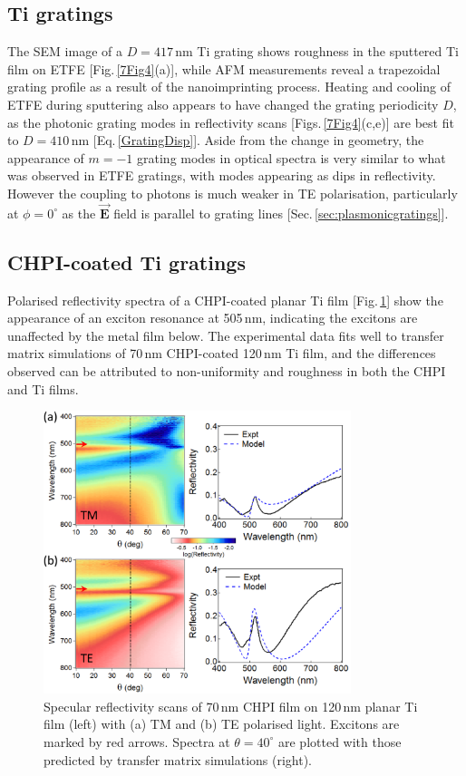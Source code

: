\subsection{Ti gratings}
The SEM image of a $D=417$\,nm Ti grating shows roughness in the sputtered Ti film on ETFE [Fig.\,\ref{7Fig4}(a)], while AFM measurements reveal a trapezoidal grating profile as a result of the nanoimprinting process. Heating and cooling of ETFE during sputtering also appears to have changed the grating periodicity $D$, as the photonic grating modes in reflectivity scans [Figs.\,\ref{7Fig4}(c,e)] are best fit to $D=410$\,nm [Eq.\,\ref{GratingDisp}]. Aside from the change in geometry, the appearance of $m=-1$ grating modes in optical spectra is very similar to what was observed in ETFE gratings, with modes appearing as dips in reflectivity. However the coupling to photons is much weaker in TE polarisation, particularly at $\phi=0^{\circ}$ as the $\vec{\mathbf{E}}$ field is parallel to grating lines [Sec.\,\ref{sec:plasmonicgratings}].



\subsection{CHPI-coated Ti gratings}
Polarised reflectivity spectra of a CHPI-coated planar Ti film [Fig.\,\ref{7Fig5}] show the appearance of an exciton resonance at 505\,nm, indicating the excitons are unaffected by the metal film below. The experimental data fits well to transfer matrix simulations \cite{Born1999} of 70\,nm CHPI-coated 120\,nm Ti film, and the differences observed can be attributed to non-uniformity and roughness in both the CHPI and Ti films.
\begin{figure}[h!] 
\centering    
\includegraphics[width=0.8\textwidth]{Fig5}
\caption[(a) TM and (b) TE polarised reflectivity scans of 70\,nm CHPI film on 120\,nm planar Ti film compared to transfer matrix simulations.]{Specular reflectivity scans of 70\,nm CHPI film on 120\,nm planar Ti film (left) with (a) TM and (b) TE polarised light. Excitons are marked by red arrows. Spectra at $\theta=40^{\circ}$ are plotted with those predicted by transfer matrix simulations (right).}
\label{7Fig5}
\end{figure}


